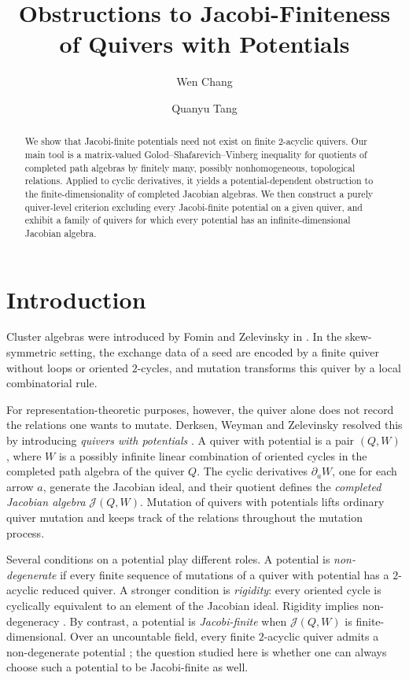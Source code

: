 \documentclass[11pt,letterpaper,reqno]{amsart}
\title{Obstructions to Jacobi-Finiteness of Quivers with Potentials}
\author[W.~Chang]{Wen Chang}
\author[Q.~Tang]{Quanyu Tang}
\date{}
\theoremstyle{definition}
\newcommand{\Jac}{\mathcal J}
\begin{document}
	
	\begin{abstract}
		We show that Jacobi-finite potentials need not exist on finite
		$2$-acyclic quivers.
		Our main tool is a matrix-valued
		Golod--Shafarevich--Vinberg inequality for quotients of completed path
		algebras by finitely many, possibly nonhomogeneous, topological relations.
		Applied to cyclic derivatives, it yields a potential-dependent obstruction
		to the finite-dimensionality of completed Jacobian algebras.  We then construct a purely quiver-level criterion excluding every
		Jacobi-finite potential on a given quiver, and exhibit a family of quivers for which every potential has an infinite-dimensional Jacobian algebra. 
	\end{abstract}
	
	\maketitle
	\setcounter{tocdepth}{2} %
	
	\tableofcontents
	\section{Introduction}
	
	Cluster algebras were introduced by Fomin and Zelevinsky in
	\cite{FominZelevinsky}.  In the skew-symmetric setting, the exchange data of
	a seed are encoded by a finite quiver without loops or oriented $2$-cycles,
	and mutation transforms this quiver by a local combinatorial rule. 
	
	For representation-theoretic purposes, however, the quiver alone does not
	record the relations one wants to mutate.  Derksen, Weyman and Zelevinsky
	resolved this by introducing \emph{quivers with potentials}
	\cite{DerksenWeymanZelevinsky}.  A quiver with potential is a pair $(Q,W)$,
	where $W$ is a possibly infinite linear combination of oriented cycles in
	the completed path algebra of the quiver $Q$. The
	cyclic derivatives $\partial_aW$, one for each arrow $a$, generate the
	Jacobian ideal, and their quotient defines the \emph{completed Jacobian algebra}
	$\Jac(Q,W)$. Mutation of quivers with potentials lifts ordinary quiver
	mutation and keeps track of the relations throughout the mutation process. 
	
	Several conditions on a potential play different roles.  A potential is
	\emph{non-degenerate} if every finite sequence of 
	mutations of a quiver with potential has a $2$-acyclic reduced quiver.  A stronger condition is
	\emph{rigidity}: every oriented cycle is cyclically equivalent to an element
	of the Jacobian ideal.  Rigidity implies non-degeneracy
	\cite{DerksenWeymanZelevinsky}.  By contrast, a potential is
	\emph{Jacobi-finite} when $\Jac(Q,W)$ is finite-dimensional.  Over an
	uncountable field, every finite $2$-acyclic quiver admits a non-degenerate
	potential \cite[Corollary~7.4]{DerksenWeymanZelevinsky}; the question studied
	here is whether one can always choose such a potential to be Jacobi-finite as
	well.
	
\end{document}

